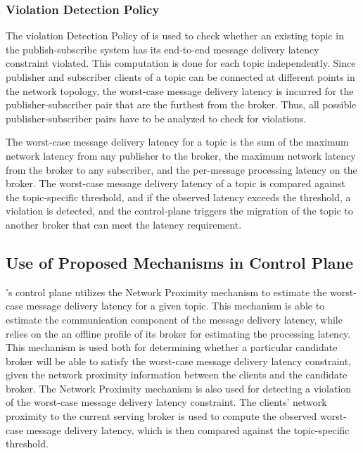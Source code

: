 \subsubsection{Violation Detection Policy}
The violation Detection Policy of \epulsar{} is used to check whether an existing topic in the publish-subscribe system has its end-to-end message delivery latency constraint violated. This computation is done for each topic independently. Since publisher and subscriber clients of a topic can be connected at different points in the network topology, the worst-case message delivery latency is incurred for the publisher-subscriber pair that are the furthest from the broker. Thus, all possible publisher-subscriber pairs have to be analyzed to check for violations.
\par The worst-case message delivery latency for a topic is the sum of the maximum network latency from any publisher to the broker, the maximum network latency from the broker to any subscriber, and the per-message processing latency on the broker. The worst-case message delivery latency of a topic is compared against the topic-specific threshold, and if the observed latency exceeds the threshold, a violation is detected, and the control-plane triggers the migration of the topic to another broker that can meet the latency requirement.
\subsection{Use of Proposed Mechanisms in Control Plane}
\epulsar{}'s control plane utilizes the Network Proximity mechanism to estimate the worst-case message delivery latency for a given topic. This mechanism is able to estimate the communication component of the message delivery latency, while \epulsar{} relies on the an offline profile of its broker for estimating the processing latency. This mechanism is used both for determining whether a particular candidate broker will be able to satisfy the worst-case message delivery latency constraint, given the network proximity information between the clients and the candidate broker. The Network Proximity mechanism is also used for detecting a violation of the worst-case message delivery latency constraint. The clients' network proximity to the current serving broker is used to compute the observed worst-case message delivery latency, which is then compared against the topic-specific threshold.

